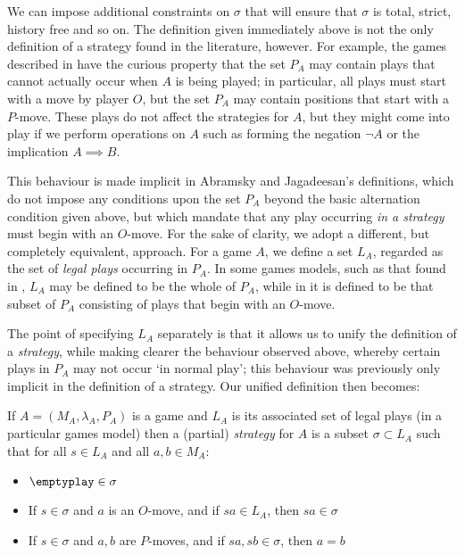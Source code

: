 \documentclass[11pt]{article} %
\begin{document}
We can impose additional constraints on $\sigma$ that will ensure that $\sigma$ is total, strict, history free and so on.  The definition given immediately above is not the only definition of a strategy found in the literature, however.  For example, the games described in \cite{abramskyjagadeesangames} have the curious property that the set $P_A$ may contain plays that cannot actually occur when $A$ is being played; in particular, all plays must start with a move by player $O$, but the set $P_A$ may contain positions that start with a $P$-move.  These plays do not affect the strategies for $A$, but they might come into play if we perform operations on $A$ such as forming the negation $\neg A$ or the implication $A\implies B$.  

This behaviour is made implicit in Abramsky and Jagadeesan's definitions, which do not impose any conditions upon the set $P_A$ beyond the basic alternation condition given above, but which mandate that any play occurring \emph{in a strategy} must begin with an $O$-move.  For the sake of clarity, we adopt a different, but completely equivalent, approach.  For a game $A$, we define a set $L_A$, regarded as the set of \emph{legal plays} occurring in $P_A$.  In some games models, such as that found in \cite{blassgames}, $L_A$ may be defined to be the whole of $P_A$, while in \cite{abramskyjagadeesangames} it is defined to be that subset of $P_A$ consisting of plays that begin with an $O$-move.

The point of specifying $L_A$ separately is that it allows us to unify the definition of a \emph{strategy}, while making clearer the behaviour observed above, whereby certain plays in $P_A$ may not occur `in normal play'; this behaviour was previously only implicit in the definition of a strategy.  Our unified definition then becomes:

\begin{definition}
  If $A=(M_A,\lambda_A,P_A)$ is a game and $L_A$ is its associated set of legal plays (in a particular games model) then a (partial) \emph{strategy} for $A$ is a subset $\sigma\subset L_A$ such that for all $s\in L_A$ and all $a, b\in M_A$:
  \begin{itemize}
    \item $\emptyplay\in\sigma$
    \item If $s\in\sigma$ and $a$ is an $O$-move, and if $sa\in L_A$, then $sa\in\sigma$
    \item If $s\in\sigma$ and $a,b$ are $P$-moves, and if $sa,sb\in\sigma$, then $a=b$
  \end{itemize}
\end{definition}
\end{document}
